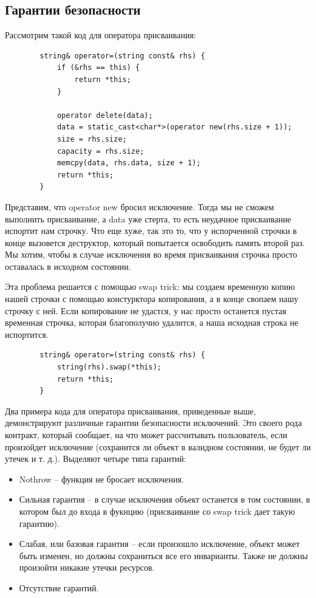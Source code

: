 \documentclass[12pt, a4paper]{article}
\begin{document}
	\subsection{Гарантии безопасности}
	Рассмотрим такой код для оператора присваивания:
	\begin{verbatim}
		string& operator=(string const& rhs) {
			if (&rhs == this) {
				return *this;
			}
			
			operator delete(data);
			data = static_cast<char*>(operator new(rhs.size + 1));
			size = rhs.size;
			capacity = rhs.size;
			memcpy(data, rhs.data, size + 1);
			return *this;
		}
	\end{verbatim}
	Представим, что operator new бросил исключение. Тогда мы не сможем выполнить присваивание, а data уже стерта, то есть неудачное присваивание испортит нам строчку. Что еще хуже, так это то, что у испорченной строчки в конце вызовется деструктор, который попытается освободить память второй раз. Мы хотим, чтобы в случае исключения во время присваивания строчка просто оставалась в исходном состоянии.
	\par Эта проблема решается с помощью swap trick: мы создаем временную копию нашей строчки с помощью констурктора копирования, а в конце свопаем нашу строчку с ней. Если копирование не удастся, у нас просто останется пустая временная строчка, которая благополучно удалится, а наша исходная строка не испортится.
	\begin{verbatim}
		string& operator=(string const& rhs) {
			string(rhs).swap(*this);
			return *this;
		}
	\end{verbatim}
	\par Два примера кода для оператора присваивания, приведенные выше, демонстрируют различные гарантии безопасности исключений. Это своего рода контракт, который сообщает, на что может рассчитывать пользователь, если произойдет исключение (сохранится ли объект в валидном состоянии, не будет ли утечек и т. д.). Выделяют четыре типа гарантий:
	\begin{itemize}
		\item Nothrow -- функция не бросает исключения.
		\item Сильная гарантия -- в случае исключения объект останется в том состоянии, в котором был до входа в фукнцию (присваивание со swap trick дает такую гарантию).
		\item Слабая, или базовая гарантия -- если произошло исключение, объект может быть изменен, но должны сохраниться все его инварианты. Также не должны произойти никакие утечки ресурсов.
		\item Отсутствие гарантий.
	\end{itemize}
\end{document}
